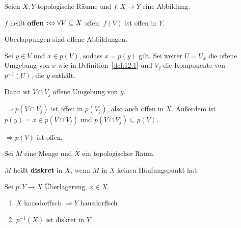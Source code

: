 \begin{definition}
    Seien $X, Y$ topologische Räume und $f:X \rightarrow Y$ eine 
    Abbildung.

    $f$ heißt \textbf{offen} $:\Leftrightarrow \forall V \subseteq X$ offen: $f(V)$ ist offen in $Y$.
\end{definition}

\begin{korollar} %
    Überlappungen sind offene Abbildungen.
\end{korollar}

\begin{beweis}
    Sei $y \in V$ und $x \in p(V)$, sodass $x=p(y)$ gilt.
    Sei weiter $U = U_x$ die offene Umgebung von $x$ wie in Definition~\ref{def:12.1}
    und $V_j$ die Komponente von $p^{-1}(U)$, die $y$ enthält.

    Dann ist $V \cap V_j$ offene Umgebung von $y$.

    $\Rightarrow p(V \cap V_j)$ ist offen in $p(V_j)$, also auch offen
    in $X$. Außerdem ist $p(y) = x \in p(V \cap V_j)$ und
    $p(V \cap V_j) \subseteq p(V)$.

    $\Rightarrow p(V)$ ist offen.
\end{beweis}

\begin{definition}
    Sei $M$ eine Menge und $X$ ein topologischer Raum.

    $M$ heißt \textbf{diskret} in $X$, wenn $M$ in $X$ keinen 
    Häufungspunkt hat.
\end{definition}

\begin{korollar} %
    Sei $p: Y \rightarrow X$ Überlagerung, $x \in X$.
    \begin{enumerate}[label=\alph*)]
        \item $X$ hausdorffsch $\Rightarrow Y$ hausdorffsch
        \item $p^{-1}(X)$ ist diskret in $Y$
    \end{enumerate}
\end{korollar}

